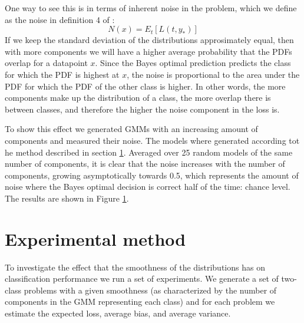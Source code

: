 \documentclass[a4paper]{article}
\begin{document}
One way to see this is in terms of inherent noise in the problem, which we define as the noise in definition 4 of \cite{Domingos2000}:
\begin{equation}
\label{eq:noise}
N(x) = E_t[L(t,y_*)]
\end{equation}
If we keep the standard deviation of the distributions approsimately equal, then with more components we will have a higher average probability that the \ac{PDF}s overlap for a datapoint $x$. Since the Bayes optimal prediction predicts the class for which the \ac{PDF} is highest at $x$, the noise is proportional to the area under the \ac{PDF} for which the \ac{PDF} of the other class is higher. In other words, the more components make up the distribution of a class, the more overlap there is between classes, and therefore the higher the noise component in the loss is.

To show this effect we generated \ac{GMM}s with an increasing amount of components and measured their noise. The models where generated according tot he method described in section \ref{sec:experimental_method}. Averaged over 25 random models of the same number of components, it is clear that the noise increases with the number of components, growing asymptotically towards 0.5, which represents the amount of noise where the Bayes optimal decision is correct half of the time: chance level. The results are shown in Figure \ref{fig:noisepercomp}.

\begin{figure}
    \label{fig:noisepercomp}
    
\end{figure}


\section{Experimental method}
\label{sec:experimental_method}

To investigate the effect that the smoothness of the distributions has on classification performance we run a set of experiments. We generate a set of two-class problems with a given smoothness (as characterized by the number of components in the \ac{GMM} representing each class) and for each problem we estimate the expected loss, average bias, and average variance.
\end{document}
